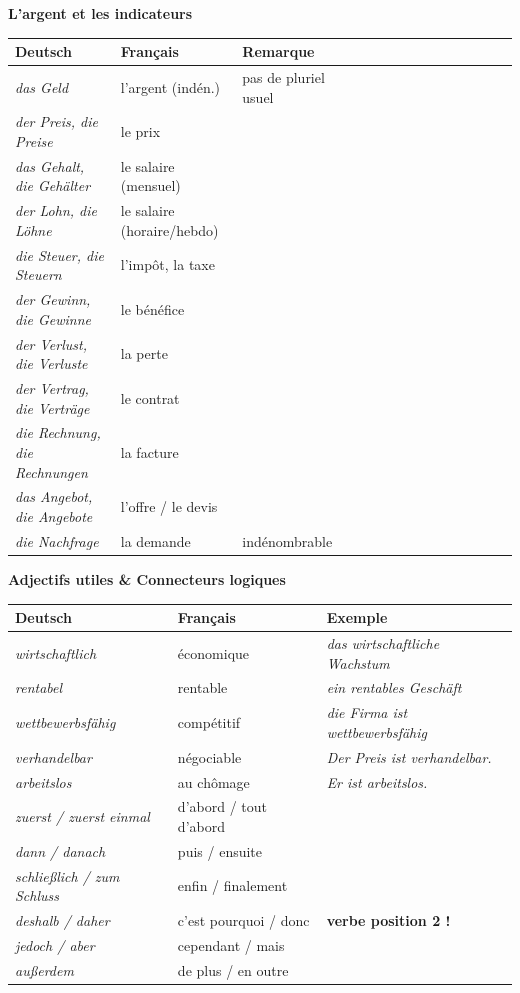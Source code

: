 \documentclass[11pt]{article}
\newcommand{\all}[1]{\ifmmode\text{\textit{#1}}\else\begingroup\selectlanguage{ngerman}\itshape #1\endgroup\fi}
\begin{document}
\begin{aretenir}
\textbf{L'argent et les indicateurs}
\begin{center}
\begin{tabular}{|l|l|lcccccccccccc|}
\hline
\rowcolor{popblueL} \textbf{Deutsch} & \textbf{Français} & \textbf{Remarque} \\
\hline
\all{das Geld} & l'argent (indén.) & pas de pluriel usuel \\
\all{der Preis, die Preise} & le prix &  \\
\all{das Gehalt, die Gehälter} & le salaire (mensuel) &  \\
\all{der Lohn, die Löhne} & le salaire (horaire/hebdo) &  \\
\all{die Steuer, die Steuern} & l'impôt, la taxe & \\
\all{der Gewinn, die Gewinne} & le bénéfice & \\
\all{der Verlust, die Verluste} & la perte & \\
\all{der Vertrag, die Verträge} & le contrat & \\
\all{die Rechnung, die Rechnungen} & la facture & \\
\all{das Angebot, die Angebote} & l'offre / le devis & \\
\all{die Nachfrage} & la demande & indénombrable \\
\hline
\end{tabular}
\end{center}

\textbf{Adjectifs utiles \& Connecteurs logiques}
\begin{center}
\begin{tabular}{|l|l|l|}
\hline
\rowcolor{popblueL} \textbf{Deutsch} & \textbf{Français} & \textbf{Exemple} \\
\hline
\all{wirtschaftlich} & économique & \all{das wirtschaftliche Wachstum} \\
\all{rentabel} & rentable & \all{ein rentables Geschäft} \\
\all{wettbewerbsfähig} & compétitif & \all{die Firma ist wettbewerbsfähig} \\
\all{verhandelbar} & négociable & \all{Der Preis ist verhandelbar.} \\
\all{arbeitslos} & au chômage & \all{Er ist arbeitslos.} \\
\hline
\all{zuerst / zuerst einmal} & d'abord / tout d'abord &  \\
\all{dann / danach} & puis / ensuite &  \\
\all{schließlich / zum Schluss} & enfin / finalement &  \\
\all{deshalb / daher} & c'est pourquoi / donc & \textbf{verbe position 2 !} \\
\all{jedoch / aber} & cependant / mais &  \\
\all{außerdem} & de plus / en outre &  \\
\hline
\end{tabular}
\end{center}
\end{aretenir}
\end{document}
